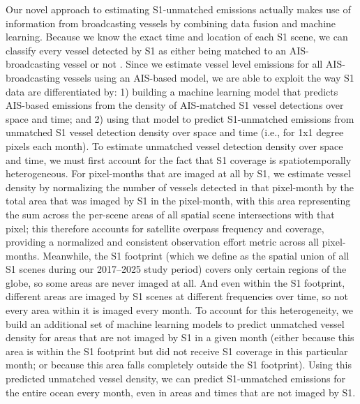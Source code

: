 \documentclass[lineno,pdflatex,sn-nature]{sn-jnl}
\begin{document}
Our novel approach to estimating S1-unmatched emissions actually makes use of information from broadcasting vessels by combining data fusion and machine learning. Because we know the exact time and location of each S1 scene, we can classify every vessel detected by S1 as either being matched to an AIS-broadcasting vessel or not \cite{paolo2024satellite}. Since we estimate vessel level emissions for all AIS-broadcasting vessels using an AIS-based model, we are able to exploit the way S1 data are differentiated by: 1) building a machine learning model that predicts AIS-based emissions from the density of AIS-matched S1 vessel detections over space and time; and 2) using that model to predict S1-unmatched emissions from unmatched S1 vessel detection density over space and time (i.e., for 1x1 degree pixels each month). To estimate unmatched vessel detection density over space and time, we must first account for the fact that S1 coverage is spatiotemporally heterogeneous. For pixel-months that are imaged at all by S1, we estimate vessel density by normalizing the number of vessels detected in that pixel-month by the total area that was imaged by S1 in the pixel-month, with this area representing the sum across the per-scene areas of all spatial scene intersections with that pixel; this therefore accounts for satellite overpass frequency and coverage, providing a normalized and consistent observation effort metric across all pixel-months. Meanwhile, the S1 footprint (which we define as the spatial union of all S1 scenes during our 2017--2025 study period) covers only certain regions of the globe, so some areas are never imaged at all. And even within the S1 footprint, different areas are imaged by S1 scenes at different frequencies over time, so not every area within it is imaged every month. To account for this heterogeneity, we build an additional set of machine learning models to predict unmatched vessel density for areas that are not imaged by S1 in a given month (either because this area is within the S1 footprint but did not receive S1 coverage in this particular month; or because this area falls completely outside the S1 footprint). Using this predicted unmatched vessel density, we can predict S1-unmatched emissions for the entire ocean every month, even in areas and times that are not imaged by S1.
\end{document}
